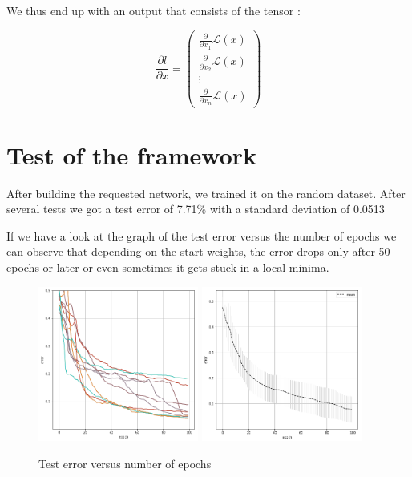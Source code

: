 \documentclass{article}
\begin{document}
We thus end up with an output that consists of the tensor :


\[\frac{\partial l}{\partial x} = \begin{pmatrix}
									\frac{\partial}{\partial x_1}\mathcal{L}(x) \\
									\frac{\partial}{\partial x_2}\mathcal{L}(x) \\
									\vdots \\
									\frac{\partial}{\partial x_n}\mathcal{L}(x) 
								  \end{pmatrix} \]
								  

\section{Test of the framework}

After building the requested network, we trained it on the random dataset. After several tests we got a test error of 7.71\% with a standard deviation of 0.0513

If we have a look at the graph of the test error versus the number of epochs we can observe that depending on the start weights, the error drops only after 50 epochs or later or even sometimes it gets stuck in a local minima.   

\begin{figure}[H]
\begin{center}
\includegraphics[width=0.47\textwidth]{err_mse_sep}
\includegraphics[width=0.47\textwidth]{err_mse}
\caption{Test error versus number of epochs}
\end{center}
\end{figure}
\end{document}
